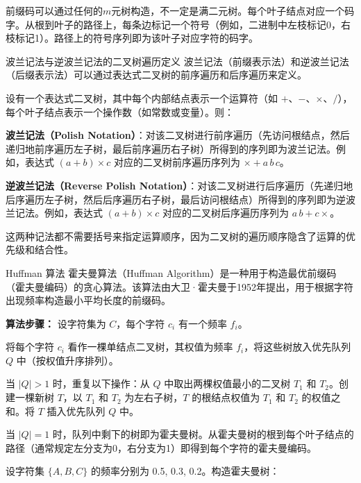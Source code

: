 前缀码可以通过任何的$m$元树构造，不一定是满二元树。每个叶子结点对应一个码字。从根到叶子的路径上，每条边标记一个符号（例如，二进制中左枝标记0，右枝标记1）。路径上的符号序列即为该叶子对应字符的码字。
\begin{definition}{波兰记法与逆波兰记法的二叉树遍历定义}{}
波兰记法（前缀表示法）和逆波兰记法（后缀表示法）可以通过表达式二叉树的前序遍历和后序遍历来定义。

设有一个表达式二叉树，其中每个内部结点表示一个运算符（如 $+$、$-$、$\times$、$/$），每个叶子结点表示一个操作数（如常数或变量）。则：

\textbf{波兰记法（Polish Notation）}：对该二叉树进行前序遍历（先访问根结点，然后递归地前序遍历左子树，最后前序遍历右子树）所得到的序列即为波兰记法。例如，表达式 $(a + b) \times c$ 对应的二叉树前序遍历序列为 $\times + a\, b\, c$。

\textbf{逆波兰记法（Reverse Polish Notation）}：对该二叉树进行后序遍历（先递归地后序遍历左子树，然后后序遍历右子树，最后访问根结点）所得到的序列即为逆波兰记法。例如，表达式 $(a + b) \times c$ 对应的二叉树后序遍历序列为 $a\, b + c \times$。

这两种记法都不需要括号来指定运算顺序，因为二叉树的遍历顺序隐含了运算的优先级和结合性。
\end{definition}
\begin{definition}{Huffman 算法}{}
霍夫曼算法（Huffman Algorithm）是一种用于构造最优前缀码（霍夫曼编码）的贪心算法。该算法由大卫·霍夫曼于1952年提出，用于根据字符出现频率构造最小平均长度的前缀码。

\textbf{算法步骤：}
设字符集为 $C$，每个字符 $c_i$ 有一个频率 $f_i$。

将每个字符 $c_i$ 看作一棵单结点二叉树，其权值为频率 $f_i$，将这些树放入优先队列 $Q$ 中（按权值升序排列）。

当 $|Q| > 1$ 时，重复以下操作：从 $Q$ 中取出两棵权值最小的二叉树 $T_1$ 和 $T_2$。创建一棵新树 $T$，以 $T_1$ 和 $T_2$ 为左右子树，$T$ 的根结点权值为 $T_1$ 和 $T_2$ 的权值之和。将 $T$ 插入优先队列 $Q$ 中。

当 $|Q| = 1$ 时，队列中剩下的树即为霍夫曼树。从霍夫曼树的根到每个叶子结点的路径（通常规定左分支为0，右分支为1）即得到每个字符的霍夫曼编码。
\end{definition}
设字符集 $\{A,B,C\}$ 的频率分别为 0.5, 0.3, 0.2。构造霍夫曼树：

